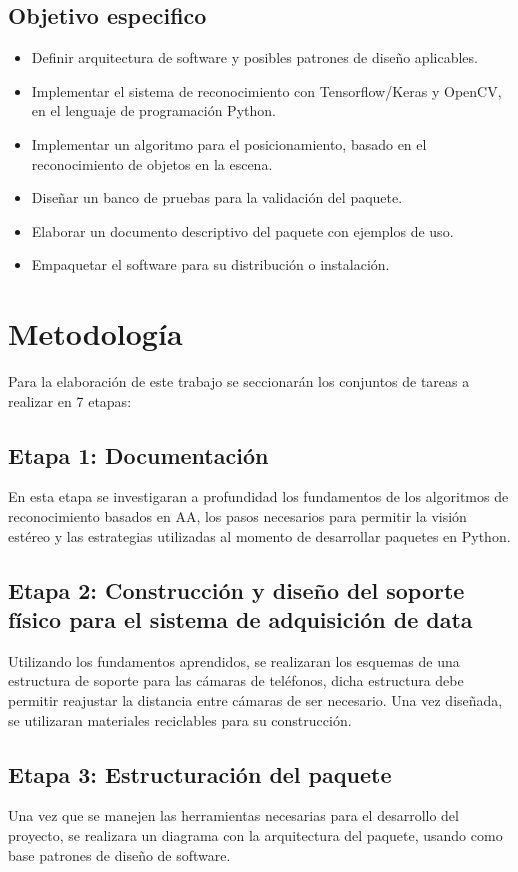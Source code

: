 \documentclass[letterpaper,titlepage,12pt,oneside,spanish,final]{report_eie}
\numberwithin{equation}{chapter}%
\numberwithin{figure}{chapter}%
\numberwithin{table}{chapter}%
\numberwithin{definition}{chapter}%
\numberwithin{lemma}{chapter}%
\numberwithin{theorem}{chapter}%
\numberwithin{corollary}{chapter}%
\numberwithin{condition}{chapter}%
\numberwithin{criterion}{chapter}%
\numberwithin{problem}{chapter}%
\numberwithin{property}{chapter}%
\numberwithin{proposition}{chapter}%
\numberwithin{solution}{chapter}%
\numberwithin{conjecture}{chapter}%
\begin{document}
\subsection*{Objetivo especifico}
\begin{itemize}
    \item Definir arquitectura de software y posibles patrones de diseño aplicables.
    \item Implementar el sistema de reconocimiento con Tensorflow/Keras y OpenCV, en el lenguaje de programación Python.
    \item Implementar un algoritmo para el posicionamiento, basado en el reconocimiento de objetos en la escena.
    \item Diseñar un banco de pruebas para la validación del paquete.
    \item Elaborar un documento descriptivo del paquete con ejemplos de uso.
    \item Empaquetar el software para su distribución o instalación.
\end{itemize}
\section*{Metodología}
Para la elaboración de este trabajo se seccionarán los conjuntos de tareas a realizar en 7 etapas:
\subsection*{Etapa 1: Documentación}
En esta etapa se investigaran a profundidad los fundamentos de los algoritmos de reconocimiento basados en AA, los pasos necesarios para permitir la visión estéreo y las estrategias utilizadas al momento de desarrollar paquetes en Python.
\subsection*{Etapa 2: Construcción y diseño del soporte físico para el sistema de adquisición de data}
Utilizando los fundamentos aprendidos, se realizaran los esquemas de una estructura de soporte para las cámaras de teléfonos, dicha estructura debe permitir reajustar la distancia entre cámaras de ser necesario. Una vez diseñada, se utilizaran materiales reciclables para su construcción.
\subsection*{Etapa 3: Estructuración del paquete}
Una vez que se manejen las herramientas necesarias para el desarrollo del proyecto, se realizara un diagrama con la arquitectura del paquete, usando como base patrones de diseño de software.
\end{document}
